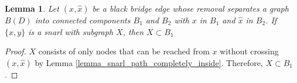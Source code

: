 \documentclass[11pt]{ucthesis}
\newtheorem{lemma}{Lemma}
\newtheorem*{proof}{Proof}
\begin{document}
\begin{lemma}
	Let $(x, \hat x)$ be a black bridge edge whose removal separates a graph $B(D)$ into connected components $B_1$ and $B_2$ with $x$ in $B_1$ and $\hat x$ in $B_2$. If $\{x, y\}$ is a snarl with subgraph $X$, then $X \subset B_1$
	\label{lemma_snarl_on_bridge_is_in_one_component}
\end{lemma}
\begin{proof}
	$X$ consists of only nodes that can be reached from $x$ without crossing $(x, \hat x)$ by Lemma \ref{lemma_snarl_path_completely_inside}. Therefore, $X \subset B_1$.
\end{proof}



\def\baselinestretch{1.0}\large\normalsize



\end{document}
